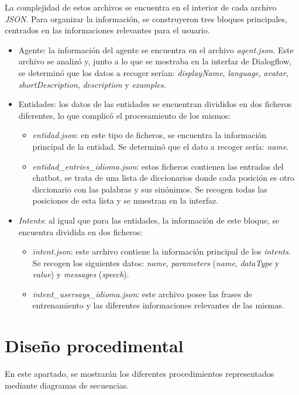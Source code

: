 La complejidad de estos archivos se encuentra en el interior de cada archivo \textit{JSON}. Para organizar la información, se construyeron tres bloques principales, centrados en las informaciones relevantes para el usuario.
\begin{itemize}
    \item Agente: la información del agente se encuentra en el archivo \textit{agent.json}. Este archivo se analizó y, junto a lo que se mostraba en la interfaz de Dialogflow, se determinó que los datos a recoger serían: \textit{displayName}, \textit{language}, \textit{avatar}, \textit{shortDescription}, \textit{description} y \textit{examples}.
    \item Entidades: los datos de las entidades se encuentran divididos en dos ficheros diferentes, lo que complicó el procesamiento de los mismos:
    \begin{itemize}
        \item \textit{entidad.json}: en este tipo de ficheros, se encuentra la información principal de la entidad. Se determinó que el dato a recoger sería: \textit{name}.
        \item \textit{entidad\_entries\_idioma.json}: estos ficheros contienen las entradas del chatbot, se trata de una lista de diccionarios donde cada posición es otro diccionario con las palabras y sus sinónimos. Se recogen todas las posiciones de esta lista y se muestran en la interfaz.
    \end{itemize}
    \item \textit{Intents}: al igual que para las entidades, la información de este bloque, se encuentra dividida en dos ficheros:
    \begin{itemize}
        \item \textit{intent.json}: este archivo contiene la información principal de los \textit{intents}. Se recogen los siguientes datos: \textit{name}, \textit{parameters} (\textit{name}, \textit{dataType} y \textit{value}) y \textit{messages} (\textit{speech}).
        \item \textit{intent\_usersays\_idioma.json}: este archivo posee las frases de entrenamiento y las diferentes informaciones relevantes de las mismas.
    \end{itemize}
\end{itemize}

\section{Diseño procedimental}
En este apartado, se mostrarán los diferentes procedimientos representados mediante diagramas de secuencias.

